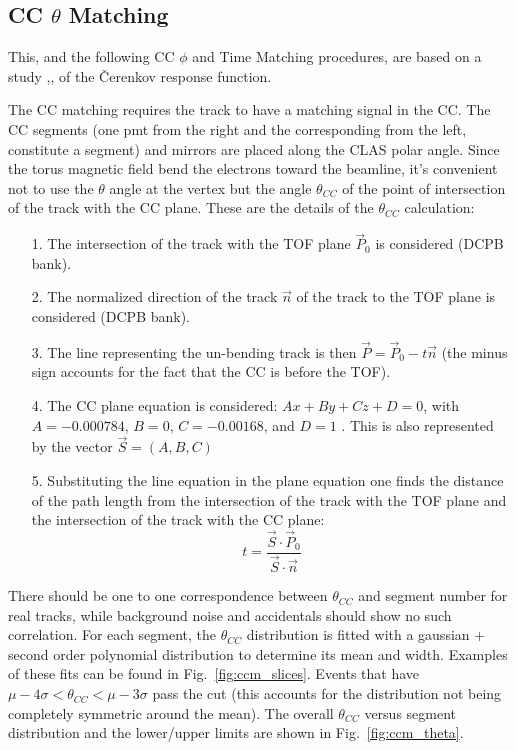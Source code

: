 \clearpage\newpage
\subsection{CC $\theta$ Matching}
This, and the following CC $\phi$ and Time Matching procedures, are based on a study
\cite{bib:ccmatch},\cite{bib:pc_fxpun}, \cite{bib:pc_osi} of the \v Cerenkov response function.

The CC matching requires the track to have a matching
signal in the CC. The CC segments (one pmt from the right and the corresponding from the left,
constitute a segment) and mirrors are placed along the CLAS polar angle.
Since the torus magnetic field bend the electrons toward the beamline, it's convenient
not to use the $\theta$ angle at the vertex but the angle $\theta_{CC}$ of the point of
intersection of the track with the CC plane. These are the details of the  $\theta_{CC}$
calculation:
\begin{itemize}
 \item [1.] The intersection of the track with the TOF plane  $\vec{P}_0$ is considered (DCPB bank).
 \item [2.] The normalized direction of the track $\vec{n}$ of the track to the TOF plane is considered (DCPB bank).
 \item [3.] The line representing the un-bending track is then $\vec{P} = \vec{P}_0 - t\vec{n}$
            (the minus sign accounts for the fact that the CC is before the TOF).
 \item [4.] The CC plane equation is considered: $Ax+By+Cz+D=0$, with
            $A=-0.000784$, $B=0$, $C=-0.00168$, and $D=1$ \cite{bib:ccmatch}. This is also represented
            by the vector $\vec{S} = (A, B, C)$
 \item [5.] Substituting the line equation in the plane equation one finds the distance of the path length from the
	         intersection of the track with the TOF plane and the intersection of the track with the CC plane:
            $$t=\frac{\vec{S} \cdot \vec{P}_0}{\vec{S} \cdot \vec{n}}$$
\end{itemize}
There should be one to one correspondence between $\theta_{CC}$ and segment number for real tracks, while
background noise and accidentals should show no such correlation.
For each segment, the $\theta_{CC}$ distribution is fitted with a gaussian + second order
polynomial distribution to determine its mean and width. Examples of these fits can be found
in Fig.~\ref{fig:ccm_slices}. Events that have $\mu - 4\sigma < \theta_{CC} < \mu - 3\sigma$
pass the cut (this accounts for the distribution not being completely symmetric around the mean).
The overall $\theta_{CC}$ versus segment distribution and the lower/upper limits
are shown in Fig.~\ref{fig:ccm_theta}.

